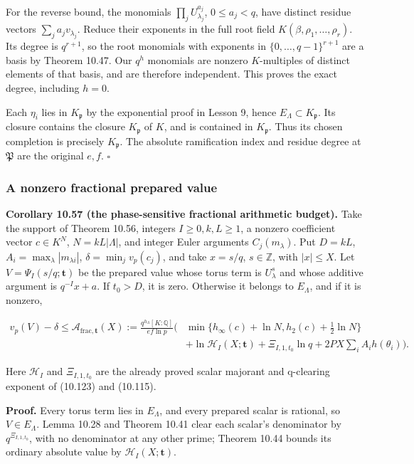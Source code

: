 \documentclass[
  11pt,
  a4paper,
]{article}
\begin{document}
For the reverse bound, the monomials \(\prod_jU_{\lambda_j}^{a_j}\),
\(0\le a_j<q\), have distinct residue vectors
\(\sum_j a_jv_{\lambda_j}\). Reduce their exponents in the full root
field \(K(\beta,\rho_1,\ldots,\rho_r)\). Its degree is \(q^{r+1}\), so
the root monomials with exponents in \(\{0,\ldots,q-1\}^{r+1}\) are a
basis by Theorem 10.47. Our \(q^h\) monomials are nonzero
\(K\)-multiples of distinct elements of that basis, and are therefore
independent. This proves the exact degree, including \(h=0\).

Each \(\eta_i\) lies in \(K_{\mathfrak p}\) by the exponential proof in
Lesson 9, hence \(E_\Lambda\subset K_{\mathfrak p}\). Its closure
contains the closure \(K_{\mathfrak p}\) of \(K\), and is contained in
\(K_{\mathfrak p}\). Thus its chosen completion is precisely
\(K_{\mathfrak p}\). The absolute ramification index and residue degree
at \(\mathfrak P\) are the original \(e,f\). \(\square\)

\subsubsection{A nonzero fractional prepared
value}\label{a-nonzero-fractional-prepared-value}

\textbf{Corollary 10.57 (the phase-sensitive fractional arithmetic
budget).} Take the support of Theorem 10.56, integers \(I\ge0,k,L\ge1\),
a nonzero coefficient vector \(c\in K^N\), \(N=kL|\Lambda|\), and
integer Euler arguments \(C_j(m_\lambda)\). Put \(D=kL\),
\(A_i=\max_\lambda|m_{\lambda i}|\), \(\delta=\min_jv_p(c_j)\), and take
\(x=s/q\), \(s\in\mathbb Z\), with \(|x|\le X\). Let
\(V=\Psi_I(s/q;\boldsymbol t)\) be the prepared value whose torus term
is \(U_\lambda^s\) and whose additive argument is \(q^{-I}x+a\). If
\(t_0>D\), it is zero. Otherwise it belongs to \(E_\Lambda\), and if it
is nonzero,

\[
\begin{aligned}
v_p(V)-\delta\le \mathcal A_{\mathrm{frac},\boldsymbol t}(X)
:=\frac{q^{h_\Lambda}[K:\mathbb Q]}{ef\ln p}\biggl(&
\min\{h_\infty(c)+\ln N,h_2(c)+\tfrac12\ln N\}\\
&+\ln\mathcal H_I(X;\boldsymbol t)
+\Xi_{I,1,t_0}\ln q
+2PX\sum_iA_i h(\theta_i)\biggr).
\end{aligned}
\tag{10.156}
\]

Here \(\mathcal H_I\) and \(\Xi_{I,1,t_0}\) are the already proved
scalar majorant and q-clearing exponent of (10.123) and (10.115).

\textbf{Proof.} Every torus term lies in \(E_\Lambda\), and every
prepared scalar is rational, so \(V\in E_\Lambda\). Lemma 10.28 and
Theorem 10.41 clear each scalar's denominator by \(q^{\Xi_{I,1,t_0}}\),
with no denominator at any other prime; Theorem 10.44 bounds its
ordinary absolute value by \(\mathcal H_I(X;\boldsymbol t)\).
\end{document}
